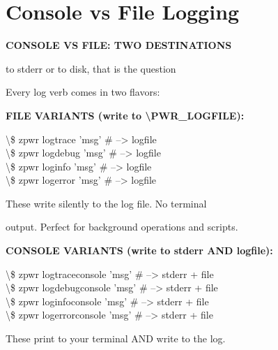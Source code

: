 \documentclass[11pt,a4paper,twoside]{book}
\begin{document}
\vspace{16pt}

\section{Console vs File Logging}


\vspace{10pt}
{\large\bfseries\color{neoncyan} CONSOLE VS FILE: TWO DESTINATIONS}\vspace{6pt}

to stderr or to disk, that is the question

Every log verb comes in two flavors:


\vspace{12pt}
{\bfseries\color{neonyellow} FILE VARIANTS (write to \textbackslash{}PWR\_LOGFILE):}\vspace{4pt}

\begin{codebox}
\textbackslash{}\$ zpwr logtrace 'msg'          \# --> logfile\\
\textbackslash{}\$ zpwr logdebug 'msg'          \# --> logfile\\
\textbackslash{}\$ zpwr loginfo 'msg'           \# --> logfile\\
\textbackslash{}\$ zpwr logerror 'msg'          \# --> logfile\\
\end{codebox}

These write silently to the log file. No terminal

output. Perfect for background operations and scripts.


\vspace{12pt}
{\bfseries\color{neonyellow} CONSOLE VARIANTS (write to stderr AND logfile):}\vspace{4pt}

\begin{codebox}
\textbackslash{}\$ zpwr logtraceconsole 'msg'   \# --> stderr + file\\
\textbackslash{}\$ zpwr logdebugconsole 'msg'   \# --> stderr + file\\
\textbackslash{}\$ zpwr loginfoconsole 'msg'    \# --> stderr + file\\
\textbackslash{}\$ zpwr logerrorconsole 'msg'   \# --> stderr + file\\
\end{codebox}

These print to your terminal AND write to the log.
\end{document}
